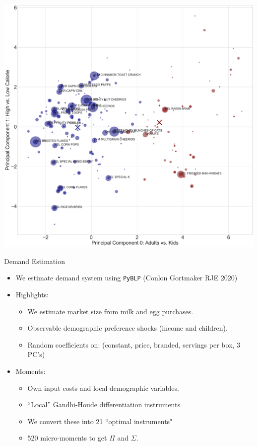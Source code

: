 \documentclass[handout, serif, aspectratio=169, 10pt]{beamer}
\begin{document}
\begin{frame}[plain]
\begin{center}
\includegraphics[height = \textheight ]{figures/pca_nests.pdf}
\end{center}
\end{frame}



\begin{frame}[plain,label=maindemand]{Demand Estimation}
\begin{itemize}
\item We estimate demand system using \texttt{PyBLP} (Conlon Gortmaker RJE 2020)
\item Highlights:
\begin{itemize}
\item We estimate market size from milk and egg purchases.
\item Observable demographic preference shocks (income and children).
\item Random coefficients on: (constant, price, branded, servings per box, 3 PC's)
\end{itemize}
\item Moments:
\begin{itemize}
\item Own input costs and local demographic variables.
\item ``Local'' Gandhi-Houde differentiation instruments
\item We convert these into 21 ``optimal instruments"
\item 520 micro-moments to get $\Pi$ and $\Sigma$.
\end{itemize}
\end{itemize}
\end{frame}
\end{document}
